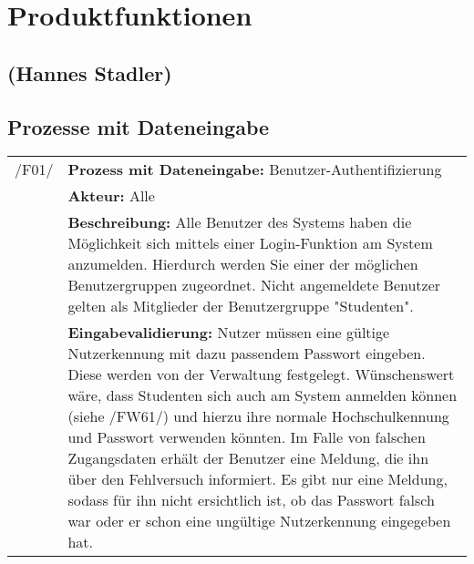 \section{Produktfunktionen}
\label{sec:Produktfunktionen}

\subsection*{(Hannes Stadler)}

\subsection{Prozesse mit Dateneingabe}

\begin{tabular}{p{1.5cm}p{14.5cm}}


	 /F01/	& \textbf{Prozess mit Dateneingabe:} Benutzer-Authentifizierung \\
				& \textbf{Akteur:} Alle \\
				& \textbf{Beschreibung:} Alle Benutzer des Systems haben die Möglichkeit sich mittels einer Login-Funktion am System anzumelden. Hierdurch werden Sie einer der möglichen Benutzergruppen zugeordnet. Nicht angemeldete Benutzer gelten als Mitglieder der Benutzergruppe "Studenten". \\
				& \textbf{Eingabevalidierung:} Nutzer müssen eine gültige Nutzerkennung mit dazu passendem Passwort eingeben. Diese werden von der Verwaltung festgelegt. Wünschenswert wäre, dass Studenten sich auch am System anmelden können (siehe /FW61/) und hierzu ihre normale Hochschulkennung und Passwort verwenden könnten. Im Falle von falschen Zugangsdaten erhält der Benutzer eine Meldung, die ihn über den Fehlversuch informiert. Es gibt nur eine Meldung, sodass für ihn nicht ersichtlich ist, ob das Passwort falsch war oder er schon eine ungültige Nutzerkennung eingegeben hat.\\[0.25cm]

\end{tabular}


